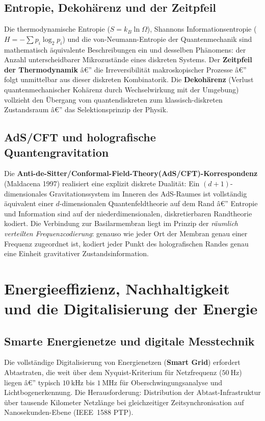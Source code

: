 ﻿\documentclass[12pt,a4paper,titlepage]{report}
\begin{document}
\subsection{Entropie, Dekohärenz und der Zeitpfeil}

Die thermodynamische Entropie ($S = k_B \ln \Omega$), Shannons Informationsentropie
($H = -\sum p_i \log_2 p_i$) und die von-Neumann-Entropie der Quantenmechanik
sind mathematisch äquivalente Beschreibungen ein und desselben Phänomens:
der Anzahl unterscheidbarer Mikrozustände eines diskreten Systems.
Der \textbf{Zeitpfeil der Thermodynamik} â€” die Irreversibilität makroskopischer
Prozesse â€” folgt unmittelbar aus dieser diskreten Kombinatorik.
Die \textbf{Dekohärenz} (Verlust quantenmechanischer Kohärenz durch Wechselwirkung
mit der Umgebung) vollzieht den Übergang vom quantendiskreten zum klassisch-diskreten
Zustandsraum â€” das Selektionsprinzip der Physik.

\subsection{AdS/CFT und holografische Quantengravitation}

Die \textbf{Anti-de-Sitter/Conformal-Field-Theory(AdS/CFT)-Korrespondenz} (Maldacena 1997)
realisiert eine explizit diskrete Dualität: Ein $(d+1)$-dimensionales Gravitationssystem
im Inneren des AdS-Raumes ist vollständig äquivalent einer $d$-dimensionalen
Quantenfeldtheorie auf dem Rand â€” Entropie und Information sind auf der
niederdimensionalen, diskretierbaren Randtheorie kodiert. Die Verbindung zur
Basilarmembran liegt im Prinzip der \emph{räumlich verteilten Frequenzcodierung}:
genauso wie jeder Ort der Membran genau einer Frequenz zugeordnet ist,
kodiert jeder Punkt des holografischen Randes genau eine Einheit gravitativer
Zustandsinformation.

\section{Energieeffizienz, Nachhaltigkeit und die Digitalisierung der Energie}

\subsection{Smarte Energienetze und digitale Messtechnik}

Die vollständige Digitalisierung von Energienetzen (\textbf{Smart Grid}) erfordert
Abtastraten, die weit über dem Nyquist-Kriterium für Netzfrequenz ($\SI{50}{\hertz}$)
liegen â€” typisch $\SI{10}{\kilo\hertz}$ bis $\SI{1}{\mega\hertz}$ für
Oberschwingungsanalyse und Lichtbogenerkennung. Die Herausforderung:
Distribution der Abtast-Infrastruktur über tausende Kilometer Netzlänge bei
gleichzeitiger Zeitsynchronisation auf Nanosekunden-Ebene (IEEE~1588 PTP).
\end{document}
